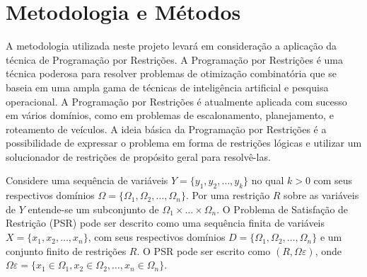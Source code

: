 


\section{Metodologia e Métodos}

A metodologia utilizada neste projeto levará em consideração a aplicação da técnica de Programação por Restrições. A Programação por Restrições é uma técnica poderosa para resolver problemas de otimização combinatória que se baseia em uma ampla gama de técnicas de inteligência artificial e pesquisa operacional. A Programação por Restrições é atualmente aplicada com sucesso em vários domínios, como em problemas de escalonamento, planejamento, e roteamento de veículos. A ideia básica da Programação por Restrições é a possibilidade de expressar o problema em forma de restrições lógicas e utilizar um solucionador de restrições de propósito geral para resolvê-las.

Considere uma sequência de variáveis $Y = \{ y_1, y_2, \dots, y_k \}$ no qual $k>0$ com seus respectivos domínios $\Omega = \{\Omega_1, \Omega_2, \dots, \Omega_n\}$. Por uma restrição $R$ sobre as variáveis de $Y$ entende-se um subconjunto de $\Omega_1 \times \dots \times \Omega_n$.
O Problema de Satisfação de Restrição (PSR) pode ser descrito como uma sequência finita de variáveis $X = \{x_1, x_2, \dots, x_n\}$, com seus respectivos domínios $D = \{\Omega_1, \Omega_2, \dots, \Omega_n\}$ e um conjunto finito de restrições $R$. 
O PSR pode ser escrito como $(R, \Omega\varepsilon)$, onde $\Omega\varepsilon = \{x_1 \in \Omega_1, x_2 \in \Omega_2, \dots, x_n \in \Omega_n \}$.

